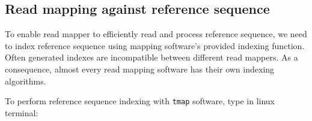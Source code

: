 \subsection{Read mapping against reference sequence}

To enable read mapper to efficiently read and process reference sequence, we need to
index reference sequence using mapping software's provided indexing function. Often generated
indexes are incompatible between different read mappers. As a consequence, almost every read
mapping software has their own indexing algorithms.

To perform reference sequence indexing with \texttt{tmap} software, type in linux terminal:\\~\\
\texttt{}\\

